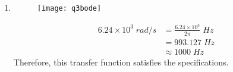 \begin{enumerate}
	\item{
	\text{}
	\begin{figure}[H]
	\begin{center}
	\texttt{[image: q3bode]}
	\end{center}
	\end{figure}
	}
	\begin{align*}
	6.24 \times 10^3 \; rad/s &= \frac{6.24 \times 10^3}{2\pi} \; Hz
	\\
	&= 993.127 \; Hz
	\\
	&\approx 1000 \; Hz
	\end{align*}
	Therefore, this transfer function satisfies the specifications.
	
	
\end{enumerate}